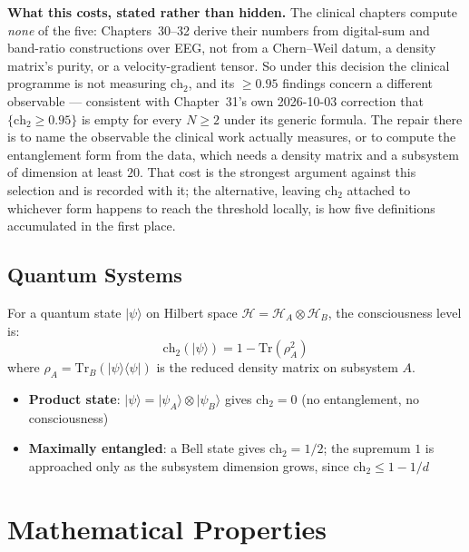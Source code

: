 \begin{remark}
\textbf{What this costs, stated rather than hidden.} The clinical chapters
compute \emph{none} of the five: Chapters~30--32 derive their numbers from
digital-sum and band-ratio constructions over EEG, not from a Chern--Weil datum,
a density matrix's purity, or a velocity-gradient tensor. So under this decision
the clinical programme is not measuring $\text{ch}_2$, and its $\ge 0.95$
findings concern a different observable --- consistent with Chapter~31's own
2026-10-03 correction that $\{\text{ch}_2 \ge 0.95\}$ is empty for every
$N \ge 2$ under its generic formula. The repair there is to name the observable
the clinical work actually measures, or to compute the entanglement form from
the data, which needs a density matrix and a subsystem of dimension at least
$20$. That cost is the strongest argument against this selection and is recorded
with it; the alternative, leaving $\text{ch}_2$ attached to whichever form
happens to reach the threshold locally, is how five definitions accumulated in
the first place.
\end{remark}

\subsection{Quantum Systems}

\begin{proposition}\label{prop:quantum-consciousness}
For a quantum state $|\psi\rangle$ on Hilbert space $\mathcal{H} = \mathcal{H}_A \otimes \mathcal{H}_B$, the consciousness level is:
\begin{equation}
\text{ch}_2(|\psi\rangle) = 1 - \text{Tr}(\rho_A^2)
\end{equation}
where $\rho_A = \text{Tr}_B(|\psi\rangle\langle\psi|)$ is the reduced density matrix on subsystem $A$.
\end{proposition}

\begin{itemize}
\item \textbf{Product state}: $|\psi\rangle = |\psi_A\rangle \otimes |\psi_B\rangle$ gives $\text{ch}_2 = 0$ (no entanglement, no consciousness)
\item \textbf{Maximally entangled}: a Bell state gives $\text{ch}_2 = 1/2$; the supremum $1$ is approached only as the subsystem dimension grows, since $\text{ch}_2 \le 1 - 1/d$
\end{itemize}

\section{Mathematical Properties}
\label{sec:math-properties-ch5}

